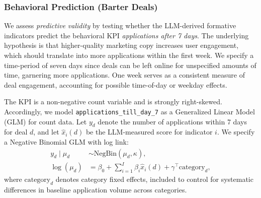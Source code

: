 \subsubsection{Behavioral Prediction (Barter Deals)}

We assess \emph{predictive validity} by testing whether the LLM-derived formative indicators predict the behavioral KPI \textit{applications after 7 days}. The underlying hypothesis is that higher-quality marketing copy increases user engagement, which should translate into more applications within the first week. We specify a time-period of seven days since deals can be left online for unspecified amounts of time, garnering more applications. One week serves as a consistent measure of deal engagement, accounting for possible time-of-day or weekday effects. 

The KPI is a non-negative count variable and is strongly right-skewed. Accordingly, we model \texttt{applications\_till\_day\_7} as a Generalized Linear Model (GLM) for count data. Let $y_d$ denote the number of applications within 7 days for deal $d$, and let $\hat{x}_i(d)$ be the LLM-measured score for indicator $i$. We specify a Negative Binomial GLM with log link:
\begin{align}
y_d \mid \mu_d &\sim \text{NegBin}(\mu_d, \kappa),\\
\log(\mu_d) &= \beta_0 + \sum_{i=1}^{I} \beta_i \hat{x}_i(d) + \gamma^\top \text{category}_d,
\end{align}
where $\text{category}_d$ denotes category fixed effects, included to control for systematic differences in baseline application volume across categories.

